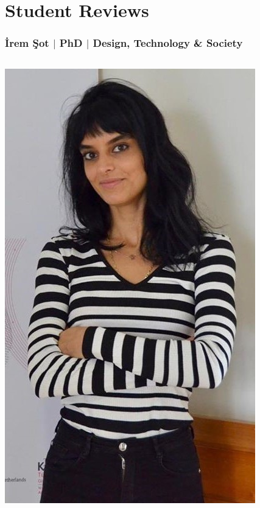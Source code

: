       \section{Student Reviews}

      \begin{frame}
        \frametitle{İrem Şot $\mid$ PhD $\mid$ Design, Technology \& Society}
        \vspace{-4mm}
        \begin{columns}
          \begin{column}{0.3\textwidth}
            \centering
            \includegraphics[width=\textwidth]{images/isot.jpg}

\end{column}
\end{columns}
\end{frame}
